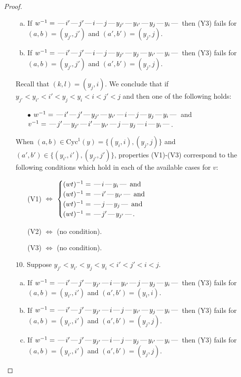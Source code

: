 \documentclass[10pt]{article}
\theoremstyle{definition}
\theoremstyle{definition}
\def\dash{\text{\hspace{0.5mm}---\hspace{0.5mm}}}
\def\Cyc{\mathrm{Cyc}}
\begin{document}
\begin{proof}
\begin{enumerate}
\begin{enumerate}[(a)]
\item If $w^{-1} = \dash i'\dash j'\dash i\dash j\dash y_{j'}\dash y_{i'}\dash y_j\dash y_i\dash $ then (Y3) fails for $(a,b)=(y_{j'},j')$ and $(a',b')=(y_j,j)$.
\item If $w^{-1} = \dash i'\dash j'\dash i\dash j\dash y_{j'}\dash y_j\dash y_{i'}\dash y_i\dash $ then (Y3) fails for $(a,b)=(y_{j'},j')$ and $(a',b')=(y_j,j)$.
\end{enumerate}
Recall that $(k,l) = (y_j,i)$.
We conclude that if $y_{j'} < y_{i'} < i' < y_j < y_i < i < j' < j$ and then one of the following holds:
\begin{enumerate}
\item[$\bullet$] $w^{-1} = \dash i'\dash j'\dash y_{j'}\dash y_{i'}\dash i\dash j\dash y_j\dash y_i\dash $ and $v^{-1} = \dash j'\dash y_{j'}\dash i'\dash y_{i'}\dash j\dash y_j\dash i\dash y_i\dash $.
\end{enumerate}
When $(a,b)\in\Cyc^1(y)=\{(y_i,i),(y_j,j)\}$ and $(a',b')\in\{(y_{i'},i'),(y_{j'},j')\}$,
properties (V1)-(V3) correspond to the following conditions which hold in
each of the available cases for $v$:
\begin{enumerate}
\item[](V1) $\Leftrightarrow$ $\begin{cases}\text{$(wt)^{-1} = \dash i \dash y_i \dash$}\text{ and }\\
\text{$(wt)^{-1} = \dash i' \dash y_{i'} \dash$}\text{ and }\\
\text{$(wt)^{-1} = \dash j \dash y_j \dash$}\text{ and }\\
\text{$(wt)^{-1} = \dash j' \dash y_{j'} \dash$}.\end{cases}$
\item[](V2) $\Leftrightarrow$ (no condition).
\item[](V3) $\Leftrightarrow$ (no condition).
\end{enumerate}
\item[$10$.] Suppose $y_{j'} < y_{i'} < y_j < y_i < i' < j' < i < j$.
\begin{enumerate}[(a)]
\item If $w^{-1} = \dash i'\dash j'\dash y_{j'}\dash i\dash y_{i'}\dash j\dash y_j\dash y_i\dash $ then (Y3) fails for $(a,b)=(y_{i'},i')$ and $(a',b')=(y_i,i)$.
\item If $w^{-1} = \dash i'\dash j'\dash y_{j'}\dash i\dash j\dash y_{i'}\dash y_j\dash y_i\dash $ then (Y3) fails for $(a,b)=(y_{i'},i')$ and $(a',b')=(y_j,j)$.
\item If $w^{-1} = \dash i'\dash j'\dash y_{j'}\dash i\dash j\dash y_j\dash y_{i'}\dash y_i\dash $ then (Y3) fails for $(a,b)=(y_{i'},i')$ and $(a',b')=(y_j,j)$.

\end{enumerate}
\end{enumerate}
\end{proof}
\end{document}
